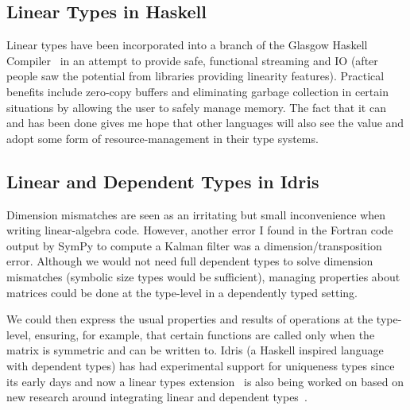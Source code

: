\subsection{Linear Types in Haskell}

Linear types have been incorporated into a branch of the Glasgow Haskell
Compiler~\cite{retrofitting} in an attempt to provide safe, functional
streaming and IO (after people saw the potential from libraries providing
linearity features). Practical benefits include zero-copy buffers and
eliminating garbage collection in certain situations by allowing the user to
safely manage memory. The fact that it can and has been done gives me hope that
other languages will also see the value and adopt some form of
resource-management in their type systems.

\subsection{Linear and Dependent Types in Idris}\label{subsec:lin_dep_types}

Dimension mismatches are seen as an irritating but small inconvenience when
writing linear-algebra code. However, another error I found in the Fortran code
output by SymPy to compute a Kalman filter was a dimension/transposition error.
Although we would not need full dependent types to solve dimension mismatches
(symbolic size types would be sufficient), managing properties about matrices
could be done at the type-level in a dependently typed setting.

We could then express the usual properties and results of operations at the
type-level, ensuring, for example, that certain functions are called only when
the matrix is symmetric and can be written to. Idris (a Haskell inspired
language with dependent types) has had experimental support for uniqueness
types since its early days and now a linear types extension~\cite{idris_linear}
is also being worked on based on new research around integrating linear and
dependent types~\cite{atkey}.
